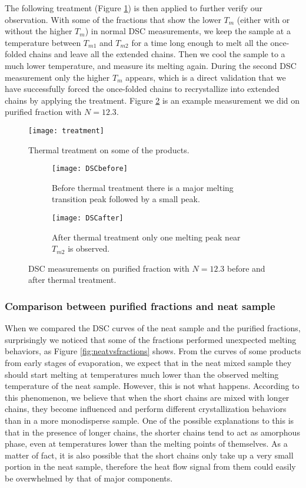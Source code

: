 The following treatment (Figure \ref{fig:treatment}) is then applied to further verify our observation. With some of the fractions that show the lower $T_{m}$ (either with or without the higher $T_{m}$) in normal DSC measurements, we keep the sample at a temperature between $T_{m1}$ and $T_{m2}$ for a time long enough to melt all the once-folded chains and leave all the extended chains. Then we cool the sample to a much lower temperature, and measure its melting again. During the second DSC measurement only the higher $T_{m}$ appears, which is a direct validation that we have successfully forced the once-folded chains to recrystallize into extended chains by applying the treatment. Figure \ref{fig:DSC before and after} is an example measurement we did on purified fraction with $N = 12.3$.

\begin{figure}[H]
\center
\texttt{[image: treatment]}
\caption{Thermal treatment on some of the products.}
\label{fig:treatment}
\end{figure}

\begin{figure}[H]
	\centering
\begin{subfigure}[b]{0.6\linewidth}
	\texttt{[image: DSCbefore]}
	\caption{Before thermal treatment there is a major melting transition peak followed by a small peak.}
\end{subfigure}
\begin{subfigure}[b]{0.6\linewidth}
	\texttt{[image: DSCafter]}
	\caption{After thermal treatment only one melting peak near $T_{m2}$ is observed.}
\end{subfigure}
\caption{DSC measurements on purified fraction with $N = 12.3$ before and after thermal treatment.}
\label{fig:DSC before and after}
\end{figure}

\subsubsection{Comparison between purified fractions and neat sample}

When we compared the DSC curves of the neat sample and the purified fractions, surprisingly we noticed that some of the fractions performed unexpected melting behaviors, as Figure \ref{fig:neatvsfractions} shows. From the curves of some products from early stages of evaporation, we expect that in the neat mixed sample they should start melting at temperatures much lower than the observed melting temperature of the neat sample. However, this is not what happens. According to this phenomenon, we believe that when the short chains are mixed with longer chains, they become influenced and perform different crystallization behaviors than in a more monodisperse sample. One of the possible explanations to this is that in the presence of longer chains, the shorter chains tend to act as amorphous phase, even at temperatures lower than the melting points of themselves. As a matter of fact, it is also possible that the short chains only take up a very small portion in the neat sample, therefore the heat flow signal from them could easily be overwhelmed by that of major components.

